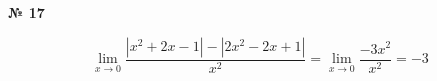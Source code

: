 \documentclass{article}
\begin{document}
\textbf{№ 17} 

\begingroup
\Large

$$ \lim\limits_{x \to 0} \frac{\left| x^2+2x-1 \right| - \left| 2x^2-2x+1 \right|}{x^2}
= \lim\limits_{x \to 0} \frac{-3x^2}{x^2}
= -3  $$

\endgroup
\end{document}
